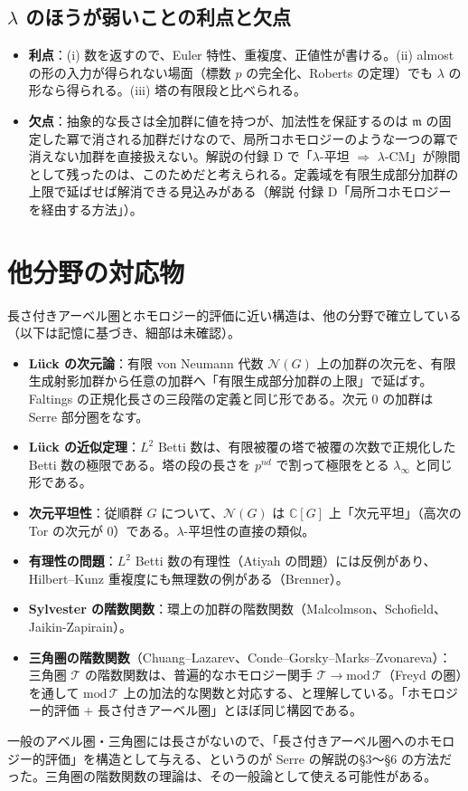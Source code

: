 \documentclass[11pt,a4paper]{ltjsarticle}
\theoremstyle{plain}
\theoremstyle{definition}
\theoremstyle{remark}
\theoremstyle{plain}
\newcommand{\m}{\mathfrak{m}}
\begin{document}
\subsection{$\lambda$ のほうが弱いことの利点と欠点}
\begin{itemize}
  \item \textbf{利点}：(i) 数を返すので、Euler 特性、重複度、正値性が書ける。(ii) almost の形の入力が得られない場面（標数 $p$ の完全化、Roberts の定理）でも $\lambda$ の形なら得られる。(iii) 塔の有限段と比べられる。
  \item \textbf{欠点}：抽象的な長さは全加群に値を持つが、加法性を保証するのは $\m$ の固定した冪で消される加群だけなので、局所コホモロジーのような一つの冪で消えない加群を直接扱えない。解説の付録 D で「$\lambda$-平坦 $\Rightarrow$ $\lambda$-CM」が隙間として残ったのは、このためだと考えられる。定義域を有限生成部分加群の上限で延ばせば解消できる見込みがある（解説 付録 D「局所コホモロジーを経由する方法」）。
\end{itemize}

\section{他分野の対応物}

長さ付きアーベル圏とホモロジー的評価に近い構造は、他の分野で確立している（以下は記憶に基づき、細部は未確認）。
\begin{itemize}
  \item \textbf{Lück の次元論}：有限 von Neumann 代数 $\mathcal{N}(G)$ 上の加群の次元を、有限生成射影加群から任意の加群へ「有限生成部分加群の上限」で延ばす。Faltings の正規化長さの三段階の定義と同じ形である。次元 $0$ の加群は Serre 部分圏をなす。
  \item \textbf{Lück の近似定理}：$L^2$ Betti 数は、有限被覆の塔で被覆の次数で正規化した Betti 数の極限である。塔の段の長さを $p^{nd}$ で割って極限をとる $\lambda_\infty$ と同じ形である。
  \item \textbf{次元平坦性}：従順群 $G$ について、$\mathcal{N}(G)$ は $\mathbb{C}[G]$ 上「次元平坦」（高次の Tor の次元が $0$）である。$\lambda$-平坦性の直接の類似。
  \item \textbf{有理性の問題}：$L^2$ Betti 数の有理性（Atiyah の問題）には反例があり、Hilbert--Kunz 重複度にも無理数の例がある（Brenner）。
  \item \textbf{Sylvester の階数関数}：環上の加群の階数関数（Malcolmson、Schofield、Jaikin-Zapirain）。
  \item \textbf{三角圏の階数関数}（Chuang--Lazarev、Conde--Gorsky--Marks--Zvonareva）：三角圏 $\mathscr{T}$ の階数関数は、普遍的なホモロジー関手 $\mathscr{T}\to\mathrm{mod}\,\mathscr{T}$（Freyd の圏）を通して $\mathrm{mod}\,\mathscr{T}$ 上の加法的な関数と対応する、と理解している。「ホモロジー的評価 $+$ 長さ付きアーベル圏」とほぼ同じ構図である。
\end{itemize}
一般のアベル圏・三角圏には長さがないので、「長さ付きアーベル圏へのホモロジー的評価」を構造として与える、というのが Serre の解説の§3〜§6 の方法だった。三角圏の階数関数の理論は、その一般論として使える可能性がある。
\end{document}
